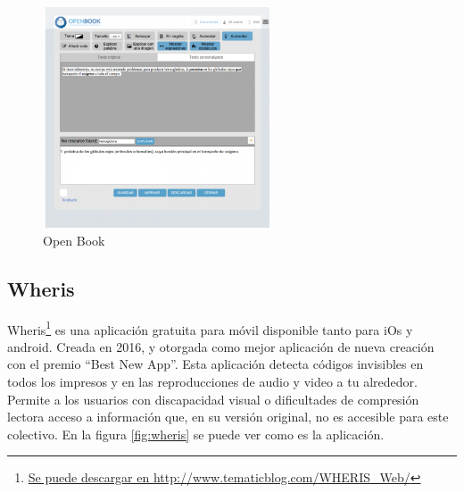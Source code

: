 \begin{figure}[h]
	\centering
	\includegraphics[width=0.6\textwidth]{Imagenes/ProyectosMateriales/openBook}
	\caption{Open Book}
	\label{fig:openBook}
\end{figure} 
\newpage
\subsection{Wheris }

Wheris\footnote{\href{http://www.tematicblog.com/WHERIS\_Web//}{Se puede descargar en http://www.tematicblog.com/WHERIS\_Web/}} es una aplicación gratuita para móvil disponible tanto para iOs y android. Creada en 2016, y otorgada como mejor aplicación de nueva creación con el premio ``Best New App''. Esta aplicación detecta códigos invisibles en todos los impresos y en las reproducciones de audio y video a tu alrededor. Permite a los usuarios con discapacidad visual o dificultades de compresión lectora acceso a información que, en su versión original, no es accesible para este colectivo. En la figura \ref{fig:wheris} se puede ver como es la aplicación.



